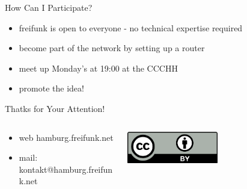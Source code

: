\documentclass[c]{beamer}
\begin{document}
\begin{frame}{How Can I Participate?}
	\begin{itemize}
		\item freifunk is open to everyone - no technical expertise required
		\item become part of the network by setting up a router
		\item meet up Monday's at 19:00 at the CCCHH
		\item promote the idea!
	\end{itemize}
\end{frame}


\begin{frame}{Thatks for Your Attention!}
	\begin{columns}
		\begin{column}{0.6\textwidth}
			\begin{itemize}
				\item web hamburg.freifunk.net
				\item mail: kontakt@hamburg.freifunk.net
		\end{itemize}
		\end{column}
		\begin{column}{0.5\textwidth}
			\begin{center}
				\includegraphics[width=0.5\textwidth]{cc-by}
			\end{center}
		\end{column}
	\end{columns}
\end{frame}
\end{document}

